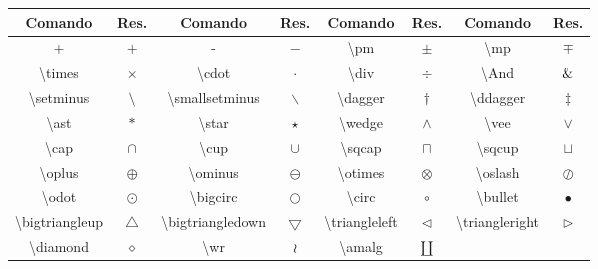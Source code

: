 % 
% 
% 
% 
% 
\begin{tabular}{cc|cc|cc|cc}
    \hline
    Comando & Res. & Comando & Res. & Comando & Res. & Comando & Res. \\ \hline
    + & $+$ & - & $-$ & \textbackslash\textsf{pm} & $\pm$ & \textbackslash\textsf{mp} & $\mp$ \\
    \textbackslash\textsf{times} & $\times$ & \textbackslash\textsf{cdot} & $\cdot$ & \textbackslash\textsf{div} & $\div$ & \textbackslash\textsf{And} & $\And$ \\
    \textbackslash\textsf{setminus} & $\setminus$ & \textbackslash\textsf{smallsetminus} & $\smallsetminus$ & \textbackslash\textsf{dagger} & $\dagger$ & \textbackslash\textsf{ddagger} & $\ddagger$ \\
    \textbackslash\textsf{ast} & $\ast$ & \textbackslash\textsf{star} & $\star$ & \textbackslash\textsf{wedge} &    $\wedge$ &  \textbackslash\textsf{vee} & $\vee$ \\
    \textbackslash\textsf{cap} & $\cap$  & \textbackslash\textsf{cup} & $\cup$  & \textbackslash\textsf{sqcap} & $\sqcap$  & \textbackslash\textsf{sqcup} & $\sqcup$ \\
    \textbackslash\textsf{oplus} & $\oplus$ & \textbackslash\textsf{ominus} & $\ominus$ & \textbackslash\textsf{otimes} & $\otimes$ & \textbackslash\textsf{oslash} & $\oslash$ \\
    \textbackslash\textsf{odot} & $\odot$  & \textbackslash\textsf{bigcirc} & $\bigcirc$  & \textbackslash\textsf{circ} & $\circ$ & \textbackslash\textsf{bullet} & $\bullet$ \\
    \textbackslash\textsf{bigtriangleup} & $\bigtriangleup$ & \textbackslash\textsf{bigtriangledown} & $\bigtriangledown$  & \textbackslash\textsf{triangleleft} & $\triangleleft$ & \textbackslash\textsf{triangleright} & $\triangleright$  \\
    \textbackslash\textsf{diamond} & $\diamond$ & \textbackslash\textsf{wr} & $\wr$ & \textbackslash\textsf{amalg} & $\amalg$ \\ \hline
\end{tabular}
